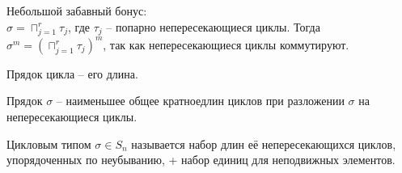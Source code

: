 Небольшой забавный бонус:\\
$\sigma = \sqcap_{j = 1}^r \tau_j$, где $\tau_j$ -- попарно непересекающиеся циклы. Тогда $\sigma^m = (\sqcap_{j = 1}^r \tau_j)^m$, так как непересекающиеся циклы коммутируют.\\
\begin{Def}
Прядок цикла -- его длина.
\end{Def}
\begin{Def}
Прядок $\sigma$ -- наименьшее общее кратноедлин циклов при разложении $\sigma$ на непересекающиеся циклы.
\end{Def}
\begin{Def}
Цикловым типом $\sigma \in S_n$ называется набор длин её непересекающихся циклов, упорядоченных по неубыванию, + набор единиц для неподвижных элементов.
\end{Def}